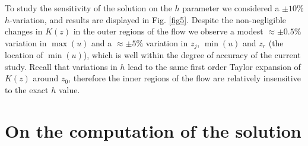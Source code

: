 To study the sensitivity of the solution on the $h$ parameter we considered a $\pm 10 \%$ $h$-variation, and results are displayed in Fig. \ref{fig5}.
Despite the non-negligible changes in $K(z)$ in the outer regions of the flow we observe a modest $\approx \pm 0.5 \%$ variation in $\max{(u)}$ and a $\approx \pm 5 \%$ variation in $z_j$, $\min{(u)}$ and $z_r$ (the location of $\min{(u)}$), which is well within the degree of accuracy of the current study. Recall that variations in $h$ lead to the same first order Taylor expansion of $K(z)$ around $z_0$, therefore the inner regions of the flow are relatively insensitive to the exact $h$ value.





\section{On the computation of the solution}

